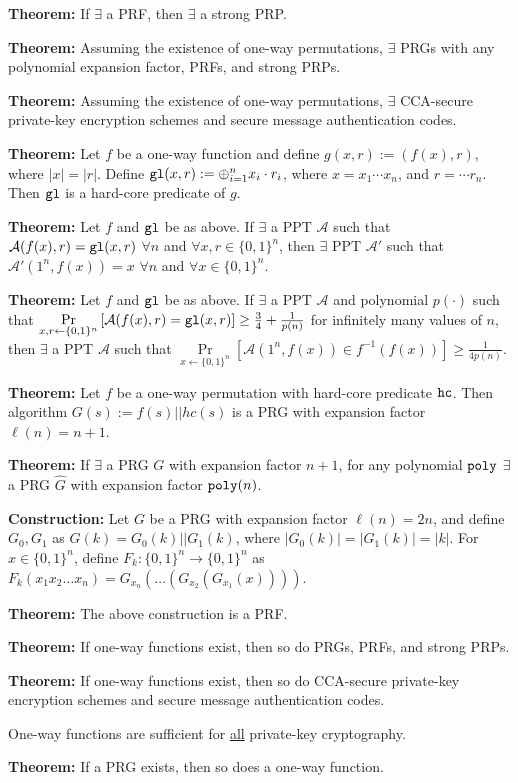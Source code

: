 \documentclass[10pt]{article}
\newcommand{\AAA}{\mathcal{A}}
\newcommand{\thm}[1]{{\bf Theorem:} \underline{#1}}
\newcommand{\con}[1]{{\bf Construction:} \underline{#1}}
\newcommand{\xor}{\oplus}
\newcommand{\poly}{{\tt poly}}
\newcommand{\hc}{{\tt hc}}
\newcommand{\gl}{{\tt gl}}
\newcommand{\from}{\leftarrow}
\begin{document}
\begin{multicols}{3}
\thm{}If $\exists$ a PRF, then $\exists$ a strong PRP.

\thm{}Assuming the existence of one-way permutations, $\exists$ PRGs with any polynomial expansion factor, PRFs, and strong PRPs.

\thm{}Assuming the existence of one-way permutations, $\exists$ CCA-secure private-key encryption schemes and secure message authentication codes.

\thm{}Let $f$ be a one-way function and define $g(x,r):=(f(x),r)$, where $|x|=|r|$. Define $\gl(x,r):=\xor_{i=1}^{n}x_i\cdot r_i$, where $x=x_1\cdots x_n$, and $r=\cdots r_n$. Then $\gl$ is a hard-core predicate of $g$.

\thm{}Let $f$ and $\gl$ be as above. If $\exists$ a PPT $\AAA$ such that $\AAA(f(x),r)=\gl(x,r)$ $\forall n$ and $\forall x,r\in\{0,1\}^n$, then $\exists$ PPT $\AAA'$ such that $\AAA'(1^n,f(x))=x$ $\forall n$ and $\forall x\in\{0,1\}^n$.

\thm{}Let $f$ and $\gl$ be as above. If $\exists$ a PPT $\AAA$ and polynomial $p(\cdot)$ such that $\Pr\limits_{x,r\from\{0,1\}^n}\left[\AAA(f(x),r)=\gl(x,r)\right]\geq\frac{3}{4}+\frac{1}{p(n)}$ for infinitely many values of $n$, then $\exists$ a PPT $\AAA$ such that $\Pr\limits_{x\from\{0,1\}^n}\left[\AAA(1^n,f(x))\in f^{-1}(f(x))\right]\geq\frac{1}{4p(n)}$.

\thm{}Let $f$ be a one-way permutation with hard-core predicate $\hc$. Then algorithm $G(s):=f(s)||hc(s)$ is a PRG with expansion factor $\ell(n)=n+1$.

\thm{}If $\exists$ a PRG $G$ with expansion factor $n+1$, for any polynomial $\poly$ $\exists$ a PRG $\hat{G}$ with expansion factor $\poly(n)$.

\con{}Let $G$ be a PRG with expansion factor $\ell(n)=2n$, and define $G_0,G_1$ as $G(k)=G_0(k)||G_1(k)$, where $|G_0(k)|=|G_1(k)|=|k|$. For $x\in\{0,1\}^n$, define $F_k:\{0,1\}^n\to\{0,1\}^n$ as $F_k(x_1x_2\dots x_n)=G_{x_n}(\dots(G_{x_2}(G_{x_1}(x))))$.

\thm{}The above construction is a PRF.

\thm{}If one-way functions exist, then so do PRGs, PRFs, and strong PRPs.

\thm{}If one-way functions exist, then so do CCA-secure private-key encryption schemes and secure message authentication codes.

One-way functions are sufficient for \underline{all} private-key cryptography.

\thm{}If a PRG exists, then so does a one-way function.


\end{multicols}
\end{document}
